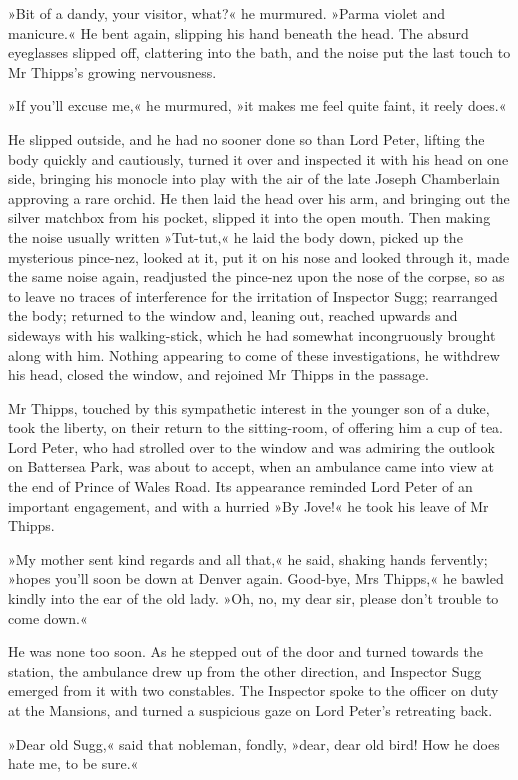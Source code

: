 »Bit of a dandy, your visitor, what?« he murmured. »Parma violet and manicure.« He bent again, slipping his hand beneath the head. The absurd eyeglasses slipped off, clattering into the bath, and the noise put the last touch to Mr Thipps's growing nervousness.

»If you'll excuse me,« he murmured, »it makes me feel quite faint, it reely does.«

He slipped outside, and he had no sooner done so than Lord Peter, lifting the body quickly and cautiously, turned it over and inspected it with his head on one side, bringing his monocle into play with the air of the late Joseph Chamberlain approving a rare orchid. He then laid the head over his arm, and bringing out the silver matchbox from his pocket, slipped it into the open mouth. Then making the noise usually written »Tut-tut,« he laid the body down, picked up the mysterious pince-nez, looked at it, put it on his nose and looked through it, made the same noise again, readjusted the pince-nez upon the nose of the corpse, so as to leave no traces of interference for the irritation of Inspector Sugg; rearranged the body; returned to the window and, leaning out, reached upwards and sideways with his walking-stick, which he had somewhat incongruously brought along with him. Nothing appearing to come of these investigations, he withdrew his head, closed the window, and rejoined Mr Thipps in the passage.

Mr Thipps, touched by this sympathetic interest in the younger son of a duke, took the liberty, on their return to the sitting-room, of offering him a cup of tea. Lord Peter, who had strolled over to the window and was admiring the outlook on Battersea Park, was about to accept, when an ambulance came into view at the end of Prince of Wales Road. Its appearance reminded Lord Peter of an important engagement, and with a hurried »By Jove!« he took his leave of Mr Thipps.

»My mother sent kind regards and all that,« he said, shaking hands fervently; »hopes you'll soon be down at Denver again. Good-bye, Mrs Thipps,« he bawled kindly into the ear of the old lady. »Oh, no, my dear sir, please don't trouble to come down.«

He was none too soon. As he stepped out of the door and turned towards the station, the ambulance drew up from the other direction, and Inspector Sugg emerged from it with two constables. The Inspector spoke to the officer on duty at the Mansions, and turned a suspicious gaze on Lord Peter's retreating back.

»Dear old Sugg,« said that nobleman, fondly, »dear, dear old bird! How he does hate me, to be sure.«